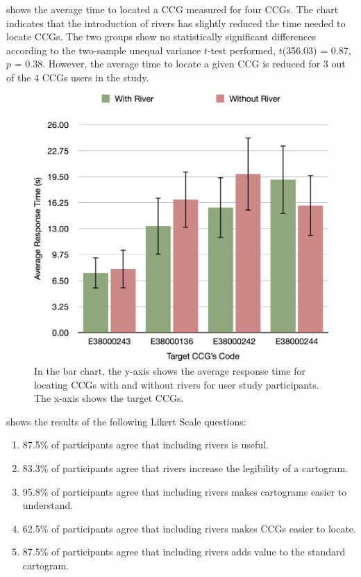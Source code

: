   shows the average time to located a CCG measured for four CCGs. The chart indicates that the introduction of rivers has slightly reduced the time needed to locate CCGs. The two groups show no statistically significant differences according to the two-sample unequal variance $t$-test performed, $t$(356.03) = 0.87, $p$ = 0.38. However, the average time to locate a given CCG is reduced for 3 out of the 4 CCGs users in the study.

    {
        \begin{figure}[t!]
            \centering
            \includegraphics[width=\columnwidth,keepaspectratio]{figure/evaluation/rt.png}
            \caption{In the bar chart, the y-axis shows the average response time for locating CCGs with and without rivers for user study participants. The x-axis shows the target CCGs.}
            \label{fig:task-rt}
        \end{figure}
    }

  shows the results of the following Likert Scale questions:
\begin{enumerate}[label=(\Alph*),align=left,leftmargin=*,labelindent=1em]
    \item 87.5\% of participants agree that including rivers is useful.
    \item 83.3\% of participants agree that rivers increase the legibility of a cartogram.
    \item 95.8\% of participants agree that including rivers makes cartograms easier to understand.
    \item 62.5\% of participants agree that including rivers makes CCGs easier to locate.
    \item 87.5\% of participants agree that including rivers adds value to the standard cartogram.
\end{enumerate}

